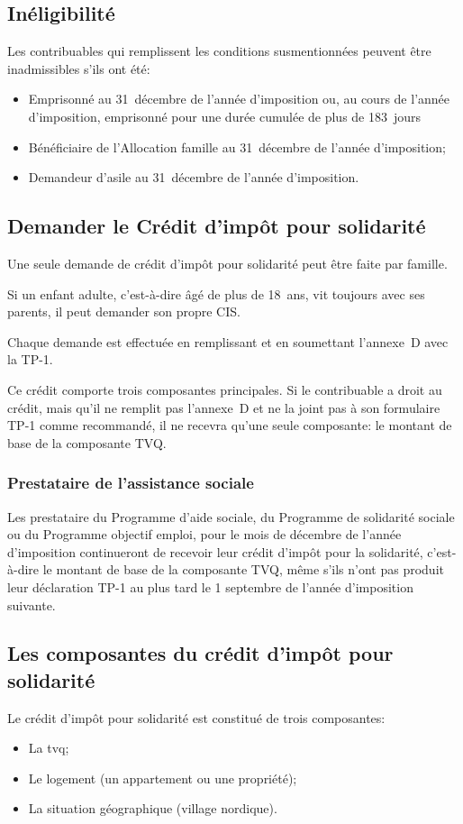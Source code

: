 \subsection{Inéligibilité}
Les contribuables qui remplissent les conditions susmentionnées peuvent être inadmissibles s'ils ont été:
\begin{itemize}[label=]
	\item Emprisonné au 31~décembre de l'année d'imposition ou, au cours de l'année d'imposition, emprisonné pour une durée cumulée de plus de 183~jours 
	\item Bénéficiaire de l'Allocation famille au 31~décembre de l'année d'imposition;
	\item Demandeur d'asile au 31~décembre de l'année d'imposition. 
\end{itemize}


\subsection{Demander le Crédit d'impôt pour solidarité}
Une seule demande de crédit d'impôt pour solidarité peut être faite par famille.

Si un enfant adulte, c'est-à-dire âgé de plus de 18~ans, vit toujours avec ses parents, il peut demander son propre CIS.

Chaque demande est effectuée en remplissant et en soumettant l'annexe~D avec la TP-1.

Ce crédit comporte trois composantes principales. Si le contribuable a droit au crédit, mais qu'il ne remplit pas l'annexe~D et ne la joint pas à son formulaire TP-1 comme recommandé, il ne recevra qu'une seule composante: le montant de base de la composante TVQ.

\subsubsection{Prestataire de l'assistance sociale}
Les prestataire du Programme d'aide sociale, du Programme de solidarité sociale ou du Programme objectif emploi, pour le mois de décembre de l'année d'imposition continueront de recevoir leur crédit d'impôt pour la solidarité, c'est-à-dire le montant de base de la composante TVQ, même s'ils n'ont pas produit leur déclaration TP-1 au plus tard le 1\ier{} septembre de l'année d'imposition suivante.


\subsection{Les composantes du crédit d'impôt pour solidarité}
Le crédit d'impôt pour solidarité est constitué de trois composantes:
\begin{itemize}
	\item La \acrshort{tvq};
	\item Le logement (un appartement ou une propriété);
	\item La situation géographique (village nordique).
\end{itemize}


